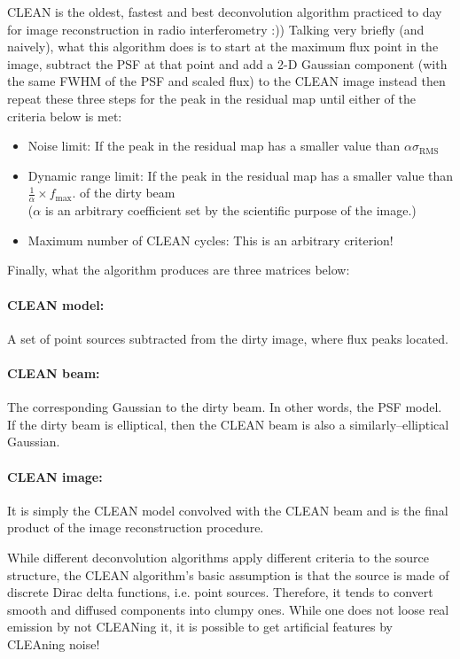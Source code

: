 \documentclass[paper=a4, fontsize=11pt]{scrartcl} %
\numberwithin{equation}{section} %
\numberwithin{figure}{section} %
\numberwithin{table}{section} %
\begin{document}
CLEAN is the oldest, fastest and best deconvolution algorithm practiced to day for image reconstruction in radio interferometry :)) Talking very briefly (and naively), what this algorithm does is to start at the maximum flux point in the image, subtract the PSF at that point and add a 2-D Gaussian component (with the same FWHM of the PSF and scaled flux) to the CLEAN image instead then repeat these three steps for the peak in the residual map until either of the criteria below is met: 
\begin{itemize}
\item Noise limit: If the peak in the residual map has a smaller value than $\alpha \sigma_\mathrm{RMS}$ 
\item Dynamic range limit: If the peak in the residual map has a smaller value than $\frac{1}{\alpha} \times f_\mathrm{max}$. of the dirty beam
\\($\alpha$ is an arbitrary coefficient set by the scientific purpose of the image.)
\item Maximum number of CLEAN cycles: This is an arbitrary criterion!
\end{itemize}


Finally, what the algorithm produces are three matrices below:
\paragraph*{CLEAN model:} A set of point sources subtracted from the dirty image, where flux peaks located.
\paragraph*{CLEAN beam:} The corresponding Gaussian to the dirty beam. In other words, the PSF model. If the dirty beam is elliptical, then the CLEAN beam is also a similarly--elliptical Gaussian.
\paragraph*{CLEAN image:} It is simply the CLEAN model convolved with the CLEAN beam and is the final product of the image reconstruction procedure. 


While different deconvolution algorithms apply different criteria to the source structure, the CLEAN algorithm's basic assumption is that the source is made of discrete Dirac delta functions, i.e. point sources. Therefore, it tends to convert smooth and diffused components into clumpy ones. While one does not loose real emission by not CLEANing it, it is possible to get artificial features by CLEAning noise!
\end{document}
